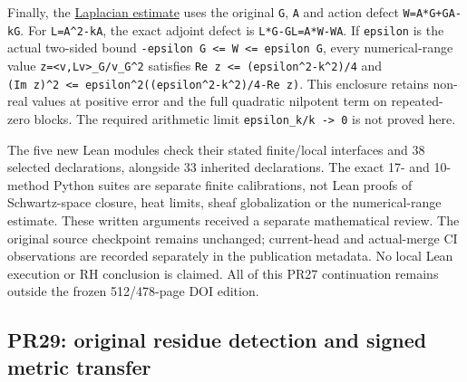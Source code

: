 \documentclass[
]{article}
\begin{document}
Finally, the
\href{https://github.com/KokunoYumeto/zeta-function-research-reader/blob/a4a87844c257485ae6d669f5b3eb6d96b9e8b8d8/workbenches/tau-specialization-curvature-formal/LAPLACIAN_PARABOLA.md}{Laplacian
estimate} uses the original \texttt{G}, \texttt{A} and action defect
\texttt{W=A*G+GA-kG}. For \texttt{L=A\^{}2-kA}, the exact adjoint defect
is \texttt{L*G-GL=A*W-WA}. If \texttt{epsilon} is the actual two-sided
bound \texttt{-epsilon\ G\ \textless{}=\ W\ \textless{}=\ epsilon\ G},
every numerical-range value
\texttt{z=\textless{}v,Lv\textgreater{}\_G/\textbar{}\textbar{}v\textbar{}\textbar{}\_G\^{}2}
satisfies \texttt{Re\ z\ \textless{}=\ (epsilon\^{}2-k\^{}2)/4} and
\texttt{(Im\ z)\^{}2\ \textless{}=\ epsilon\^{}2((epsilon\^{}2-k\^{}2)/4-Re\ z)}.
This enclosure retains non-real values at positive error and the full
quadratic nilpotent term on repeated-zero blocks. The required
arithmetic limit \texttt{epsilon\_k/k\ -\textgreater{}\ 0} is not proved
here.

The five new Lean modules check their stated finite/local interfaces and
38 selected declarations, alongside 33 inherited declarations. The exact
17- and 10-method Python suites are separate finite calibrations, not
Lean proofs of Schwartz-space closure, heat limits, sheaf globalization
or the numerical-range estimate. These written arguments received a
separate mathematical review. The original source checkpoint remains
unchanged; current-head and actual-merge CI observations are recorded
separately in the publication metadata. No local Lean execution or RH
conclusion is claimed. All of this PR27 continuation remains outside the
frozen 512/478-page DOI edition.

\subsection{PR29: original residue detection and signed metric
transfer}\label{pr29-original-residue-detection-and-signed-metric-transfer}
\end{document}
